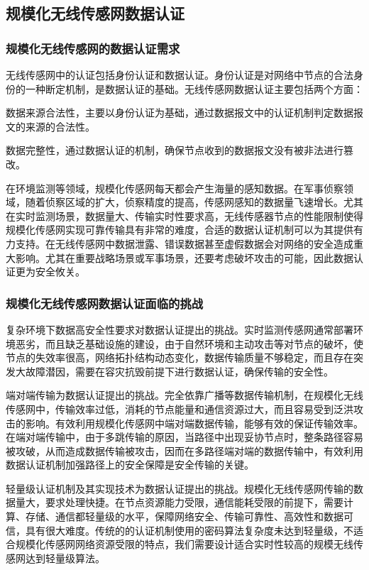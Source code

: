 \subsection{规模化无线传感网数据认证}

\subsubsection{规模化无线传感网的数据认证需求}
无线传感网中的认证包括身份认证和数据认证。身份认证是对网络中节点的合法身份的一种断定机制，是数据认证的基础。无线传感网数据认证主要包括两个方面：
\begin{compactitem}
  \item 数据来源合法性，主要以身份认证为基础，通过数据报文中的认证机制判定数据报文的来源的合法性。
  \item 数据完整性，通过数据认证的机制，确保节点收到的数据报文没有被非法进行篡改。
\end{compactitem}




在环境监测等领域，规模化传感网每天都会产生海量的感知数据。在军事侦察领域，随着侦察区域的扩大，侦察精度的提高，传感网感知的数据量飞速增长。尤其在实时监测场景，数据量大、传输实时性要求高，无线传感器节点的性能限制使得规模化传感网实现可靠传输具有非常的难度，合适的数据认证机制可以为其提供有力支持。在无线传感网中数据泄露、错误数据甚至虚假数据会对网络的安全造成重大影响。尤其在重要战略场景或军事场景，还要考虑破坏攻击的可能，因此数据认证更为安全攸关。
\subsubsection{规模化无线传感网数据认证面临的挑战}

复杂环境下数据高安全性要求对数据认证提出的挑战。实时监测传感网通常部署环境恶劣，而且缺乏基础设施的建设，由于自然环境和主动攻击等对节点的破坏，使节点的失效率很高，网络拓扑结构动态变化，数据传输质量不够稳定，而且存在突发大故障潜因，需要在容灾抗毁前提下进行数据认证，确保传输的安全性。

端对端传输为数据认证提出的挑战。完全依靠广播等数据传输机制，在规模化无线传感网中，传输效率过低，消耗的节点能量和通信资源过大，而且容易受到泛洪攻击的影响。有效利用规模化传感网中端对端数据传输，能够有效的保证传输效率。在端对端传输中，由于多跳传输的原因，当路径中出现妥协节点时，整条路径容易被攻破，从而造成数据传输被攻击，因而在多路径端对端的数据传输中，有效利用数据认证机制加强路径上的安全保障是安全传输的关键。

轻量级认证机制及其实现技术为数据认证提出的挑战。规模化无线传感网传输的数据量大，要求处理快捷。在节点资源能力受限，通信能耗受限的前提下，需要计算、存储、通信都轻量级的水平，保障网络安全、传输可靠性、高效性和数据可信，具有很大难度。传统的的认证机制使用的密码算法复杂度未达到轻量级，不适合规模化传感网网络资源受限的特点，我们需要设计适合实时性较高的规模无线传感网达到轻量级算法。

